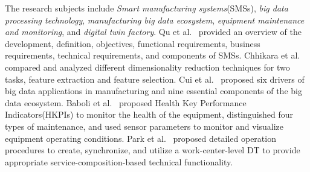 \documentclass[a4paper,fleqn]{cas-dc}
\begin{document}
The research subjects include \textit{Smart manufacturing systems}(SMSs), \textit{big data processing technology}, \textit{manufacturing big data ecosystem}, \textit{equipment maintenance and monitoring}, and \textit{digital twin factory}.
Qu et al.~\cite{Qu2019} provided an overview of the development, definition, objectives, functional requirements, business requirements, technical requirements, and components of SMSs.
Chhikara et al.~\cite{Chhikara2022} compared and analyzed different dimensionality reduction techniques for two tasks, feature extraction and feature selection.
Cui et al.~\cite{Cui2020} proposed six drivers of big data applications in manufacturing and nine essential components of the big data ecosystem.
Baboli et al.~\cite{Baboli2021} proposed Health Key Performance Indicators(HKPIs) to monitor the health of the equipment, distinguished four types of maintenance, and used sensor parameters to monitor and visualize equipment operating conditions.
Park et al.~\cite{Park2020} proposed detailed operation procedures to create, synchronize, and utilize a work-center-level DT to provide appropriate service-composition-based technical functionality.
\end{document}
